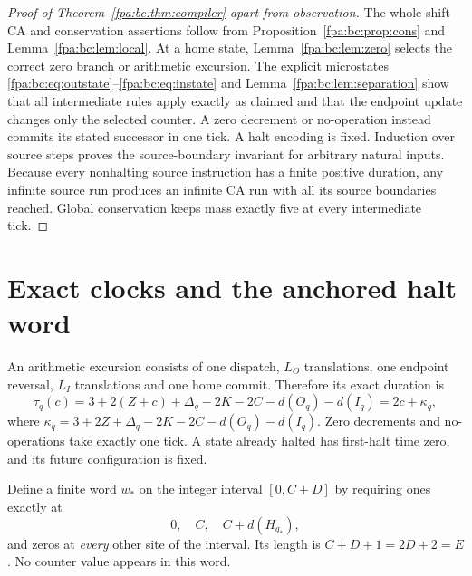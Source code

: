 \documentclass[11pt,a4paper]{article}
\numberwithin{equation}{section}
\begin{document}
\begin{proof}[Proof of Theorem~\ref{fpa:bc:thm:compiler} apart from observation]
The whole-shift CA and conservation assertions follow from
Proposition~\ref{fpa:bc:prop:cons} and Lemma~\ref{fpa:bc:lem:local}. At a home state,
Lemma~\ref{fpa:bc:lem:zero} selects the correct zero branch or arithmetic excursion.
The explicit microstates \eqref{fpa:bc:eq:outstate}--\eqref{fpa:bc:eq:instate} and
Lemma~\ref{fpa:bc:lem:separation} show that all intermediate rules apply exactly as
claimed and that the endpoint update changes only the selected counter.
A zero decrement or no-operation instead commits its stated successor in one
tick. A halt encoding is fixed. Induction over source steps proves the
source-boundary invariant for arbitrary natural inputs. Because every
nonhalting source instruction has a finite positive duration, any infinite
source run produces an infinite CA run with all its source boundaries reached.
Global conservation keeps mass exactly five at every intermediate tick.
\end{proof}

\section{Exact clocks and the anchored halt word}\label{fpa:bc:sec:clock}
An arithmetic excursion consists of one dispatch, $L_O$ translations, one
endpoint reversal, $L_I$ translations and one home commit. Therefore its
exact duration is
\begin{equation}
 \tau_q(c)=3+2(Z+c)+\Delta_q-2K-2C-d(O_q)-d(I_q)
          =2c+\kappa_q,\label{fpa:bc:eq:clock}
\end{equation}
where
$\kappa_q=3+2Z+\Delta_q-2K-2C-d(O_q)-d(I_q)$.
Zero decrements and no-operations take exactly one tick. A state already halted
has first-halt time zero, and its future configuration is fixed.

Define a finite word $w_*$ on the integer interval $[0,C+D]$ by requiring ones
exactly at
\begin{equation}
 0,\quad C,\quad C+d(H_{q_*}),\label{fpa:bc:eq:observer}
\end{equation}
and zeros at \emph{every} other site of the interval. Its length is
$C+D+1=2D+2=E$. No counter value appears in this word.
\end{document}
